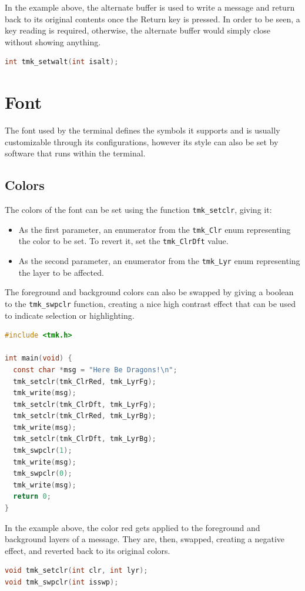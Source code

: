 \documentclass{report}
\begin{document}
In the example above, the alternate buffer is used to write a message and return back to its original contents once the Return key is pressed. In order to be seen, a key reading is required, otherwise, the alternate buffer would simply close without showing anything.
\begin{lstlisting}[language=c,caption=the declaration of the \texttt{tmk\_setwalt} function.]
int tmk_setwalt(int isalt);
\end{lstlisting}
\section{Font}
The font used by the terminal defines the symbols it supports and is usually customizable through its configurations, however its style can also be set by software that runs within the terminal.
\subsection{Colors}
The colors of the font can be set using the function \texttt{tmk\_setclr}, giving it:
\begin{itemize}
  \item As the first parameter, an enumerator from the \texttt{tmk\_Clr} enum representing the color to be set. To revert it, set the \texttt{tmk\_ClrDft} value.
  \item As the second parameter, an enumerator from the \texttt{tmk\_Lyr} enum representing the layer to be affected.
\end{itemize}

The foreground and background colors can also be swapped by giving a boolean to the \texttt{tmk\_swpclr} function, creating a nice high contrast effect that can be used to indicate selection or highlighting.
\begin{lstlisting}[language=c,caption=an example that applies and swaps the colors of a message written.]
#include <tmk.h>

int main(void) {
  const char *msg = "Here Be Dragons!\n";
  tmk_setclr(tmk_ClrRed, tmk_LyrFg);
  tmk_write(msg);
  tmk_setclr(tmk_ClrDft, tmk_LyrFg);
  tmk_setclr(tmk_ClrRed, tmk_LyrBg);
  tmk_write(msg);
  tmk_setclr(tmk_ClrDft, tmk_LyrBg);
  tmk_swpclr(1);
  tmk_write(msg);
  tmk_swpclr(0);
  tmk_write(msg);
  return 0;
}
\end{lstlisting}

In the example above, the color red gets applied to the foreground and background layers of a message. They are, then, swapped, creating a negative effect, and reverted back to its original colors.
\begin{lstlisting}[language=c,caption=the declarations of the \texttt{tmk\_setclr} and \texttt{tmk\_swpclr} functions.]
void tmk_setclr(int clr, int lyr);
void tmk_swpclr(int isswp);
\end{lstlisting}
\end{document}
